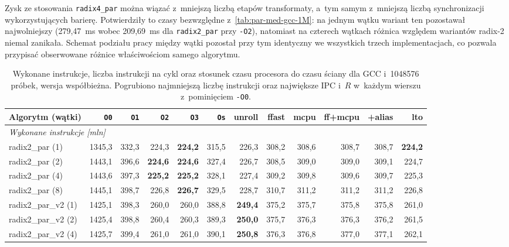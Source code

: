 Zysk ze stosowania \texttt{radix4\_par} można wiązać z~mniejszą liczbą etapów transformaty,
a~tym samym z~mniejszą liczbą synchronizacji wykorzystujących barierę.
Potwierdziły to czasy bezwzględne z~\cref{tab:par-med-gcc-1M}:
na jednym wątku wariant ten pozostawał najwolniejszy (279,47~ms wobec 209,69~ms
dla \texttt{radix2\_par} przy \texttt{-O2}), natomiast na czterech wątkach
różnica względem wariantów radix-2 niemal zanikała. Schemat podziału pracy między
wątki pozostał przy tym identyczny we wszystkich trzech implementacjach, co pozwala przypisać
obserwowane różnice właściwościom samego algorytmu.
\begin{table}[H]
\centering
\caption{Wykonane instrukcje, liczba instrukcji na cykl oraz stosunek czasu procesora do czasu ściany dla GCC i~1048576 próbek, wersja współbieżna. Pogrubiono najmniejszą liczbę instrukcji oraz największe IPC i~$R$ w~każdym wierszu z~pominięciem \texttt{-O0}.}
\label{tab:par-wykorzystanie-gcc-1M}
\scriptsize
\setlength{\tabcolsep}{3.0pt}
\begin{tabular}{lrrrrrrrrrrr}
\toprule
Algorytm (wątki) & \texttt{O0} & \texttt{O1} & \texttt{O2} & \texttt{O3} & \texttt{Os} & unroll & ffast & mcpu & ff+mcpu & +alias & lto \\
\midrule
\multicolumn{12}{l}{\textit{Wykonane instrukcje [mln]}} \\[2pt]
radix2\_par (1) & 1345,3 & 332,3 & 224,3 & \textbf{224,2} & 315,5 & 226,3 & 308,2 & 308,6 & 308,7 & 308,7 & \textbf{224,2} \\
radix2\_par (2) & 1443,1 & 396,6 & \textbf{224,6} & \textbf{224,6} & 327,4 & 226,7 & 308,5 & 309,0 & 309,0 & 309,1 & 224,7 \\
radix2\_par (4) & 1443,6 & 397,3 & \textbf{225,2} & \textbf{225,2} & 328,1 & 227,4 & 309,2 & 309,8 & 309,6 & 309,7 & 225,3 \\
radix2\_par (8) & 1445,1 & 398,7 & 226,8 & \textbf{226,7} & 329,5 & 228,7 & 310,7 & 311,2 & 311,2 & 311,2 & 226,8 \\
\addlinespace
radix2\_par\_v2 (1) & 1425,1 & 398,3 & 260,0 & 260,0 & 388,8 & \textbf{249,4} & 375,2 & 375,7 & 375,8 & 375,8 & 261,0 \\
radix2\_par\_v2 (2) & 1425,4 & 398,8 & 260,4 & 260,3 & 389,3 & \textbf{250,0} & 375,7 & 376,3 & 376,3 & 376,2 & 261,5 \\
radix2\_par\_v2 (4) & 1425,7 & 399,4 & 261,0 & 261,0 & 390,1 & \textbf{250,8} & 376,3 & 376,8 & 377,0 & 377,1 & 262,1 \\

\end{tabular}
\end{table}
